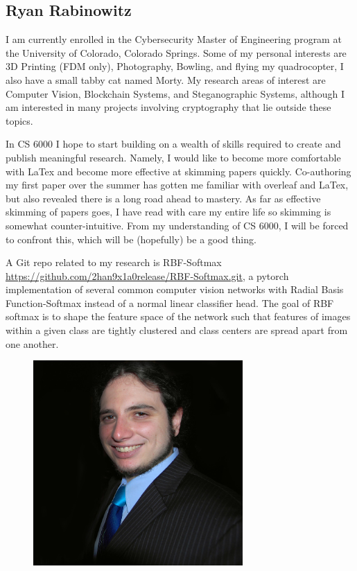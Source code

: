 \subsection{Ryan Rabinowitz}

I am currently enrolled in the Cybersecurity Master of Engineering program at the University of Colorado, Colorado Springs.
Some of my personal interests are 3D Printing (FDM only), Photography, Bowling, and flying my quadrocopter, I also have a small tabby cat named Morty. 
My research areas of interest are Computer Vision, Blockchain Systems, and Steganographic Systems, although I am interested in many projects involving cryptography that lie outside these topics. 

In CS 6000 I hope to start building on a wealth of skills required to create and publish meaningful research.
Namely, I would like to become more comfortable with LaTex and become more effective at skimming papers quickly. 
Co-authoring my first paper over the summer has gotten me familiar with overleaf and LaTex, but also revealed there is a long road ahead to mastery. 
As far as effective skimming of papers goes, I have read with care my entire life so skimming is somewhat counter-intuitive. 
From my understanding of CS 6000, I will be forced to confront this, which will be (hopefully) be a good thing.

A Git repo related to my research is RBF-Softmax \url{https://github.com/2han9x1a0release/RBF-Softmax.git}, a pytorch implementation of several common computer vision networks with Radial Basis Function-Softmax instead of a normal linear classifier head. 
The goal of RBF softmax is to shape the feature space of the network such that features of images within a given class are tightly clustered and class centers are spread apart from one another.
\begin{figure}[h]
\includegraphics[width=8cm]{Rabinowitz_Headshot.jpg}
\end{figure}